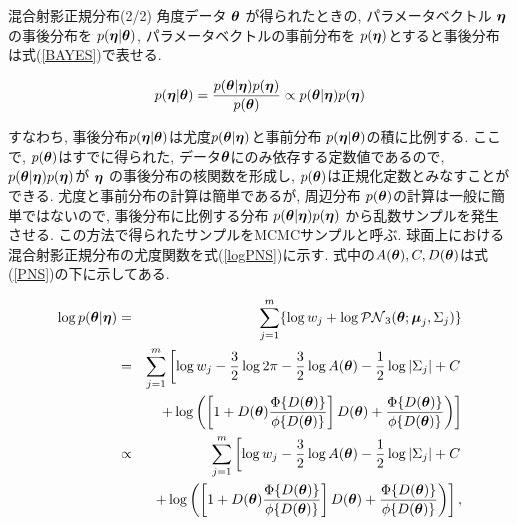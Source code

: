 \documentclass[dvipdfmx]{beamer} %
\newcommand{\bm}[1]{\mbox{\boldmath $#1$}}
\begin{document}
\begin{frame}{混合射影正規分布(2/2)}
角度データ $\bm \theta$ が得られたときの, パラメータベクトル $\bm \eta$の事後分布を $p(\bm \eta| \bm \theta)$, パラメータベクトルの事前分布を $p(\bm \eta)$とすると事後分布は式(\ref{BAYES})で表せる. 

\begin{eqnarray}
\label{BAYES}
p(\bm \eta | \bm \theta) = \frac{p(\bm \theta | \bm \eta) p(\bm \eta)}{p(\bm \theta)} \propto p(\bm \theta | \bm \eta) p(\bm \eta)
\end{eqnarray}

\noindent
すなわち, 事後分布$p(\bm \eta | \bm \theta)$は尤度$p(\bm \theta | \bm \eta)$と事前分布 $p(\bm \eta| \bm \theta)$の積に比例する. ここで, $p(\bm \theta)$はすでに得られた, データ$\bm \theta$にのみ依存する定数値であるので, $p(\bm \theta | \bm \eta) p(\bm \eta)$が $\bm \eta$  の事後分布の核関数を形成し, $p(\bm \theta)$は正規化定数とみなすことができる. 尤度と事前分布の計算は簡単であるが, 周辺分布 $p(\bm \theta)$の計算は一般に簡単ではないので, 事後分布に比例する分布 $p(\bm \theta | \bm \eta) p(\bm \eta)$ から乱数サンプルを発生させる. この方法で得られたサンプルをMCMCサンプルと呼ぶ. 球面上における混合射影正規分布の尤度関数を式(\ref{logPNS})に示す. 式中の$A(\bm \theta), C, D(\bm \theta)$は式(\ref{PNS})の下に示してある.

\begin{eqnarray}
\label{logPNS}
\log p(\bm \theta | \bm \eta) &=& \sum^m_{j=1} \{\log w_j + \log \mathcal{PN}_3(\bm \theta;\bm \mu_j, \Sigma_j)\} \nonumber \\
&=& \sum^m_{j=1} \left[ \log w_j - \frac{3}{2} \log 2\pi - \frac{3}{2} \log A(\bm \theta) - \frac{1}{2} \log |\Sigma_j| + C \right. \nonumber \\
&&\  \left. + \log \left( \left[1 + D(\bm \theta) \frac{\Phi \{D(\bm \theta)\}}{\phi \{D(\bm \theta)\}} \right] D(\bm \theta) + \frac{\Phi \{D(\bm \theta)\}}{\phi \{D(\bm \theta)\}} \right)\right] \nonumber \\
&\propto& \sum^m_{j=1} \left[ \log w_j - \frac{3}{2} \log A(\bm \theta) - \frac{1}{2} \log |\Sigma_j| + C \right. \nonumber \\
&&\ \left. + \log \left( \left[1 + D(\bm \theta) \frac{\Phi \{D(\bm \theta)\}}{\phi \{D(\bm \theta)\}} \right] D(\bm \theta) + \frac{\Phi \{D(\bm \theta)\}}{\phi \{D(\bm \theta)\}} \right) \right], 
\end{eqnarray}

\end{frame}
\end{document}

